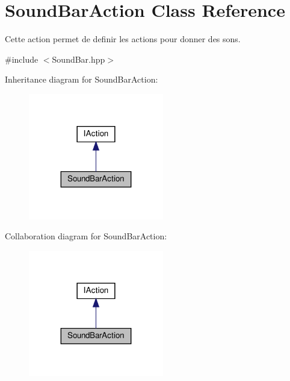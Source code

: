 \hypertarget{classSoundBarAction}{}\section{Sound\+Bar\+Action Class Reference}
\label{classSoundBarAction}


Cette action permet de definir les actions pour donner des sons.  




{\ttfamily \#include $<$Sound\+Bar.\+hpp$>$}



Inheritance diagram for Sound\+Bar\+Action\+:
\nopagebreak
\begin{figure}[H]
\begin{center}
\leavevmode
\includegraphics[width=167pt]{classSoundBarAction__inherit__graph}
\end{center}
\end{figure}


Collaboration diagram for Sound\+Bar\+Action\+:
\nopagebreak
\begin{figure}[H]
\begin{center}
\leavevmode
\includegraphics[width=167pt]{classSoundBarAction__coll__graph}
\end{center}
\end{figure}
